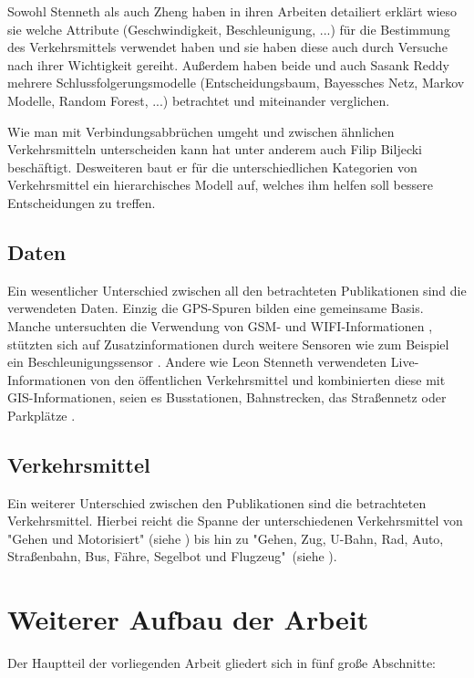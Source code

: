 Sowohl Stenneth als auch Zheng haben in ihren Arbeiten detailiert erklärt wieso sie welche Attribute (Geschwindigkeit, Beschleunigung, ...) für die Bestimmung des Verkehrsmittels verwendet haben und sie haben diese auch durch Versuche nach ihrer Wichtigkeit gereiht. Außerdem haben beide und auch Sasank Reddy mehrere Schlussfolgerungsmodelle (Entscheidungsbaum, Bayessches Netz, Markov Modelle, Random Forest, ...) betrachtet und miteinander verglichen. \cite{reddy_using_2010, stenneth_transportation_2011, zheng_understanding_2010}

Wie man mit Verbindungsabbrüchen umgeht und zwischen ähnlichen Verkehrsmitteln unterscheiden kann hat unter anderem auch Filip Biljecki beschäftigt. Desweiteren baut er für die unterschiedlichen Kategorien von Verkehrsmittel ein hierarchisches Modell auf, welches ihm helfen soll bessere Entscheidungen zu treffen. \cite{biljecki_transportation_2013}

\subsection{Daten}
Ein wesentlicher Unterschied zwischen all den betrachteten Publikationen sind die verwendeten Daten. Einzig die GPS-Spuren bilden eine gemeinsame Basis. Manche untersuchten die Verwendung von GSM- und WIFI-Informationen \cite{reddy_using_2010},  stützten sich auf Zusatzinformationen durch weitere Sensoren wie zum Beispiel ein Beschleunigungssensor \cite{reddy_using_2010, nadine_schussler_improving_2011}. Andere wie Leon Stenneth verwendeten Live-Informationen von den öffentlichen Verkehrsmittel und kombinierten diese mit GIS-Informationen, seien es Busstationen, Bahnstrecken, das Straßennetz oder Parkplätze \cite{stenneth_transportation_2011}.

\subsection{Verkehrsmittel}
Ein weiterer Unterschied zwischen den Publikationen sind die betrachteten Verkehrsmittel. Hierbei reicht die Spanne der unterschiedenen Verkehrsmittel von "Gehen und Motorisiert" (siehe \cite{reddy_using_2010}) bis hin zu "Gehen, Zug, U-Bahn, Rad, Auto, Straßenbahn, Bus, Fähre, Segelbot und Flugzeug"\ (siehe \cite{biljecki_transportation_2013}).

\section{Weiterer Aufbau der Arbeit}
Der Hauptteil der vorliegenden Arbeit gliedert sich in fünf große Abschnitte:

